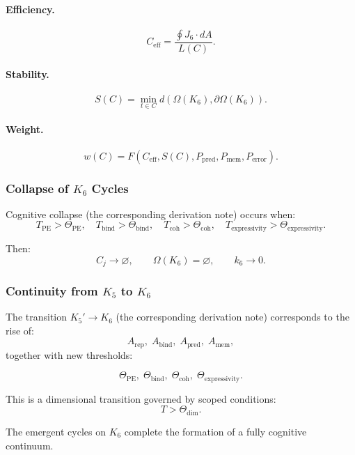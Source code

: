 \paragraph{Efficiency.}
\[
  C_{\mathrm{eff}}
    = \frac{\oint J_6\cdot dA}{L(C)}.
\]

\paragraph{Stability.}
\[
  S(C)
  = \min_{t\in C}
    d(\Omega(K_6),\partial\Omega(K_6)).
\]

\paragraph{Weight.}
\[
 w(C)
 = F(C_{\mathrm{eff}}, S(C), P_{\mathrm{pred}},
      P_{\mathrm{mem}}, P_{\mathrm{error}}).
\]

\subsubsection{Collapse of \texorpdfstring{$K_6$}{K_6} Cycles}

Cognitive collapse (the corresponding derivation note) occurs when:
\[
  T_{\mathrm{PE}}>\Theta_{\mathrm{PE}},
  \quad
  T_{\mathrm{bind}}>\Theta_{\mathrm{bind}},
  \quad
  T_{\mathrm{coh}}>\Theta_{\mathrm{coh}},
  \quad
  T_{\mathrm{expressivity}}>\Theta_{\mathrm{expressivity}}.
\]

Then:
\[
 C_j \to \varnothing,
 \qquad
 \Omega(K_6)=\varnothing,
 \qquad
 k_6\to 0.
\]

\subsubsection{Continuity from \texorpdfstring{$K_5$}{K_5} to \texorpdfstring{$K_6$}{K_6}}

The transition $K_5' \to K_6$ (the corresponding derivation note) corresponds to the rise
of:
\[
 A_{\mathrm{rep}},\;
 A_{\mathrm{bind}},\;
 A_{\mathrm{pred}},\;
 A_{\mathrm{mem}},
\]
together with new thresholds:

\[
 \Theta_{\mathrm{PE}},\;
 \Theta_{\mathrm{bind}},\;
 \Theta_{\mathrm{coh}},\;
 \Theta_{\mathrm{expressivity}}.
\]

This is a dimensional transition governed by scoped conditions:
\[
  T > \Theta_{\mathrm{dim}}.
\]

The emergent cycles on $K_6$ complete the formation of a fully cognitive continuum.
